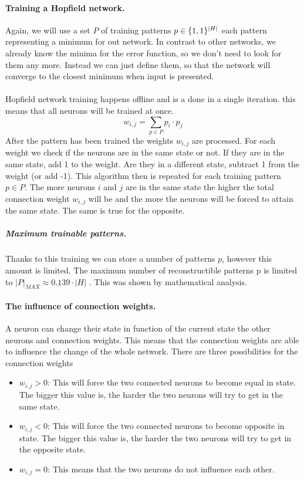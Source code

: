 \documentclass[pdftex,a4paper,12pt,twoside]{report}
\theoremstyle{plain} \newtheorem{theorem}{Theorem} \newtheorem{proposition}{Proposition} \newtheorem{lemma}{Lemma} \newtheorem*{corollary}{Corollary}
\theoremstyle{definition} \newtheorem{definition}{Definition} \newtheorem{conjecture}{Conjecture} \newtheorem*{example}{Example} \newtheorem{algorithm}{Algorithm}
\theoremstyle{remark} \newtheorem*{remark}{Remark} \newtheorem*{note}{Note} \newtheorem{case}{Case}
\begin{document}
\paragraph{Training a Hopfield network.}
Again, we will use a set $P$ of  training patterns $p \in \{\-1,1\}^{|H|}$ each pattern representing a minimum for out network. In contrast to other networks, we already know the minima for the error function, so we don't need to look for them any more. Instead we can just define them, so that the network will converge to the closest minimum when input is presented.\\\\Hopfield network training happens offline and is a done in a single iteration. this means that all neurons will be trained at once.
\begin{equation}
w_{i,j} = \sum_{p \in P} p_i \cdot p_j
\end{equation}
After the pattern has been trained the weights $w_{i,j}$ are processed. For each weight we check if the neurons are in the same state or not. If they are in the same state, add 1 to the weight. Are they in a different state, subtract 1 from the weight (or add -1). This algorithm then is repeated for each training pattern $p \in P$. The more neurons $i$ and $j$ are in the same state the higher the total connection weight $w_{i,j}$ will be and the more the neurons will be forced to attain the same state. The same is true for the opposite.
\subparagraph{Maximum trainable patterns.}
Thanks to this training we can store a number of patterns $p$, however this amount is limited. The maximum number of reconstructible patterns p is limited to $|P|_{MAX} \approx  0.139 \cdot |H|$ . This was shown by mathematical analysis.
\paragraph{The influence of connection weights.}
A neuron can change their state in function of the current state the other neurons and connection weights. This means that the connection weights are able to influence the change of the whole network. There are three possibilities for the connection weights
\begin{itemize}
\item$w_{i,j} > 0 $: This will force the two connected neurons to become equal in state. The bigger this value is, the harder the two neurons will try to get in the same state.
\item$w_{i,j} < 0 $: This will force the two connected neurons to become opposite in state. The bigger this value is, the harder the two neurons will try to get in the opposite state.
\item$w_{i,j} = 0 $: This means that the two neurons do not influence each other.
\end{itemize}
\end{document}
